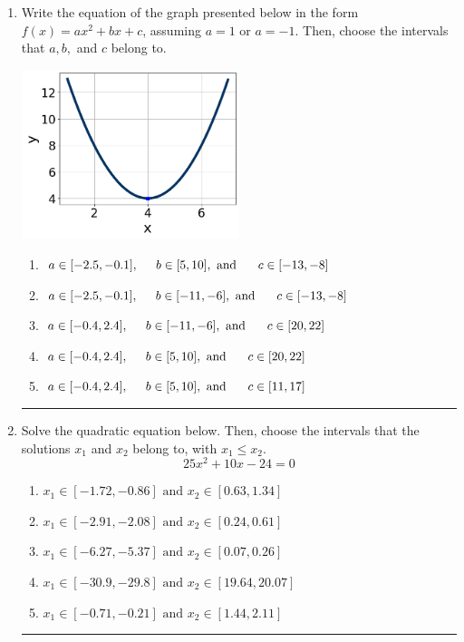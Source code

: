 \documentclass[14pt]{extbook}
\newcommand{\litem}[1]{\item#1\hspace*{-1cm}\rule{\textwidth}{0.4pt}}
\begin{document}
\begin{enumerate}
{\begin{enumerate}[label=\Alph*.]
\end{enumerate} }
\litem{
Write the equation of the graph presented below in the form $f(x)=ax^2+bx+c$, assuming  $a=1$ or $a=-1$. Then, choose the intervals that $a, b,$ and $c$ belong to.
\begin{center}
    \includegraphics[width=0.5\textwidth]{../Figures/quadraticGraphToEquationB.png}
\end{center}
\begin{enumerate}[label=\Alph*.]
\item \( a \in [-2.5, -0.1], \hspace*{5mm} b \in [5, 10], \text{ and } \hspace*{5mm} c \in [-13, -8] \)
\item \( a \in [-2.5, -0.1], \hspace*{5mm} b \in [-11, -6], \text{ and } \hspace*{5mm} c \in [-13, -8] \)
\item \( a \in [-0.4, 2.4], \hspace*{5mm} b \in [-11, -6], \text{ and } \hspace*{5mm} c \in [20, 22] \)
\item \( a \in [-0.4, 2.4], \hspace*{5mm} b \in [5, 10], \text{ and } \hspace*{5mm} c \in [20, 22] \)
\item \( a \in [-0.4, 2.4], \hspace*{5mm} b \in [5, 10], \text{ and } \hspace*{5mm} c \in [11, 17] \)

\end{enumerate} }
\litem{
Solve the quadratic equation below. Then, choose the intervals that the solutions $x_1$ and $x_2$ belong to, with $x_1 \leq x_2$.\[ 25x^{2} +10 x -24 = 0 \]\begin{enumerate}[label=\Alph*.]
\item \( x_1 \in [-1.72, -0.86] \text{ and } x_2 \in [0.63, 1.34] \)
\item \( x_1 \in [-2.91, -2.08] \text{ and } x_2 \in [0.24, 0.61] \)
\item \( x_1 \in [-6.27, -5.37] \text{ and } x_2 \in [0.07, 0.26] \)
\item \( x_1 \in [-30.9, -29.8] \text{ and } x_2 \in [19.64, 20.07] \)
\item \( x_1 \in [-0.71, -0.21] \text{ and } x_2 \in [1.44, 2.11] \)


\end{enumerate}}
\end{enumerate}
\end{document}
